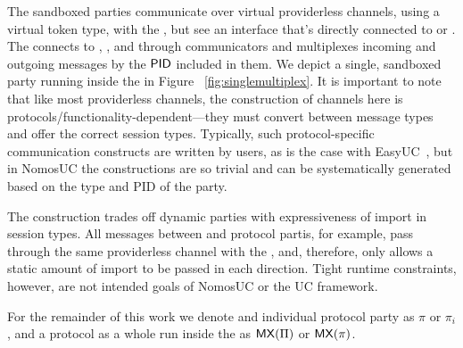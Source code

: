 The sandboxed parties communicate over virtual providerless channels, using a virtual token type, with the \partywrapper, but see an interface that's directly connected to \F or \Z. 
The \partywrapper connects to \F, \A, and \Z through communicators and multiplexes incoming and outgoing messages by the $\mathsf{PID}$ included in them. 
We depict a single, sandboxed party running inside the \partywrapper in Figure ~\ref{fig:singlemultiplex}.
It is important to note that like most providerless channels, the construction of channels here is protocols/functionality-dependent---they must convert between message types and offer the correct session types. 
Typically, such protocol-specific communication constructs are written by users, as is the case with EasyUC~\cite{easyuc}, but in NomosUC the constructions are so trivial and can be systematically generated based on the type and PID of the party.


The \partywrapper construction trades off dynamic parties with expressiveness of import in session types.
All messages between \Z and protocol partis, for example, pass through the same providerless channel with the \partywrapper, and, therefore, only allows a static amount of import to be passed in each direction.
Tight runtime constraints, however, are not intended goals of NomosUC or the UC framework.

For the remainder of this work we denote and individual protocol party as $\pi$ or $\pi_i$, and a protocol as a whole run inside the \partywrapper as $\mathsf{MX}(\Pi)$ or $\mathsf{MX}(\pi)$.

